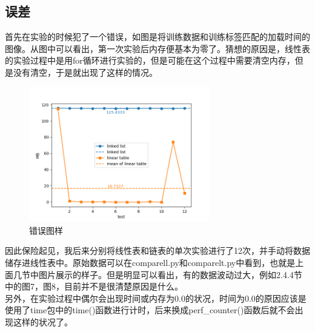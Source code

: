 \subsection{误差}
首先在实验的时候犯了一个错误，如图是将训练数据和训练标签匹配的加载时间的图像。从图中可以看出，第一次实验后内存便基本为零了。猜想的原因是，线性表的实验过程中是用for循环进行实验的，但是可能在这个过程中需要清空内存，但是没有清空，于是就出现了这样的情况。
\begin{figure}[H]
	\centering
	\includegraphics[width=0.7\textwidth]{wrong1}  %
	\caption{错误图样}
	\label{fig:your_label}
\end{figure}
因此保险起见，我后来分别将线性表和链表的单次实验进行了12次，并手动将数据储存进线性表中。原始数据可以在comparell.py和comparelt.py中看到，也就是上面几节中图片展示的样子。但是明显可以看出，有的数据波动过大，例如2.4.4节中的图7，图8，目前并不是很清楚原因是什么。\\

另外，在实验过程中偶尔会出现时间或内存为0.0的状况，时间为0.0的原因应该是使用了time包中的time()函数进行计时，后来换成perf\_counter()函数后就不会出现这样的状况了。





